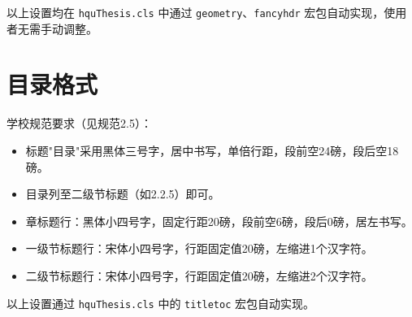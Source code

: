 以上设置均在 \verb|hquThesis.cls| 中通过 \verb|geometry|、\verb|fancyhdr| 宏包自动实现，使用者无需手动调整。

\section{目录格式}\label{sec:demo-toc}

学校规范要求（见规范2.5）：

\begin{itemize}
  \item 标题"目录"采用黑体三号字，居中书写，单倍行距，段前空24磅，段后空18磅。
  \item 目录列至二级节标题（如2.2.5）即可。
  \item 章标题行：黑体小四号字，固定行距20磅，段前空6磅，段后0磅，居左书写。
  \item 一级节标题行：宋体小四号字，行距固定值20磅，左缩进1个汉字符。
  \item 二级节标题行：宋体小四号字，行距固定值20磅，左缩进2个汉字符。
\end{itemize}

以上设置通过 \verb|hquThesis.cls| 中的 \verb|titletoc| 宏包自动实现。
